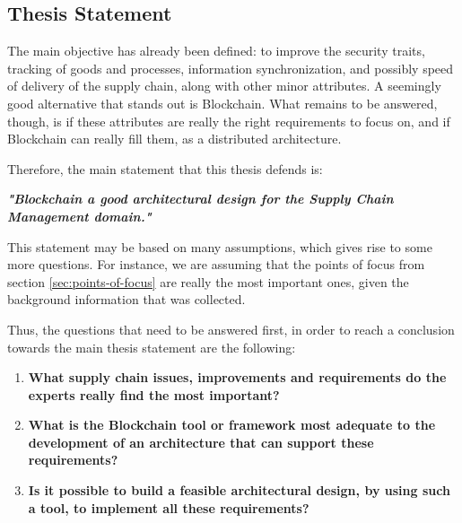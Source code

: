 \subsection{Thesis Statement}
\label{subsec:thesis-statement}
The main objective has already been defined: to improve the security traits, tracking of goods and processes, information synchronization, and possibly speed of delivery of the supply chain, along with other minor attributes. A seemingly good alternative that stands out is Blockchain. What remains to be answered, though, is if these attributes are really the right requirements to focus on, and if Blockchain can really fill them, as a distributed architecture.


Therefore, the main statement that this thesis defends is: 

\par \textbf{\textit{"Blockchain a good architectural design for the Supply Chain Management domain."}}


This statement may be based on many assumptions, which gives rise to some more questions. For instance, we are assuming that the points of focus from section \ref{sec:points-of-focus} are really the most important ones, given the background information that was collected.

Thus, the questions that need to be answered first, in order to reach a conclusion towards the main thesis statement are the following:
\begin{enumerate}
\item \textbf{What supply chain issues, improvements and requirements do the experts really find the most important?}
\item \textbf{What is the Blockchain tool or framework most adequate to the development of an architecture that can support these requirements?}
\item \textbf{Is it possible to build a feasible architectural design, by using such a tool, to implement all these requirements?}
\end{enumerate}

